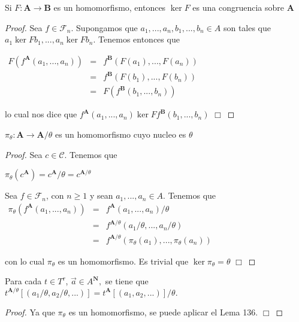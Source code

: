   \begin{lemma}
    Si \(F:\mathbf{A}\rightarrow \mathbf{B}\) es un homomorfismo, entonces \(\ker F\) es una congruencia sobre \(\mathbf{A}\)
  \end{lemma}
  \begin{proof}
    Sea \(f\in \mathcal{F}_{n}\). Supongamos que \(a_{1},...,a_{n},b_{1},...,b_{n} \in A\) son tales que \(a_{1}\ker Fb_{1},...,a_{n}\ker Fb_{n}\). Tenemos entonces que

    \(\displaystyle \begin{array}{ccl} F(f^{\mathbf{A}}(a_{1},...,a_{n})) & = & f^{\mathbf{B} }(F(a_{1}),...,F(a_{n})) \\ & = & f^{\mathbf{B}}(F(b_{1}),...,F(b_{n})) \\ & = & F(f^{\mathbf{B}}(b_{1},...,b_{n})) \end{array} \)

    lo cual nos dice que \(f^{\mathbf{A}}(a_{1},...,a_{n})\ker Ff^{\mathbf{B} }(b_{1},...,b_{n})\) \(\Box\)
  \end{proof}

  \begin{lemma}
    \(\pi _{\theta }:\mathbf{A}\rightarrow \mathbf{A}/\theta \) es un homomorfismo cuyo nucleo es \(\theta \)
  \end{lemma}
  \begin{proof}
    Sea \(c\in \mathcal{C}\). Tenemos que

    \(\displaystyle \pi _{\theta }(c^{\mathbf{A}})=c^{\mathbf{A}}/\theta =c^{\mathbf{A}/\theta } \)

    Sea \(f\in \mathcal{F}_{n}\), con \(n\geq 1\) y sean \(a_{1},...,a_{n}\in A\). Tenemos que
    \(\displaystyle \begin{array}{ccl} \pi _{\theta }(f^{\mathbf{A}}(a_{1},...,a_{n})) & = & f^{\mathbf{A} }(a_{1},...,a_{n})/\theta \\ & = & f^{\mathbf{A}/\theta }(a_{1}/\theta ,...,a_{n}/\theta ) \\ & = & f^{\mathbf{A}/\theta }(\pi _{\theta }(a_{1}),...,\pi _{\theta }(a_{n})) \end{array} \)

    con lo cual \(\pi _{\theta }\) es un homomorfismo. Es trivial que \(\ker \pi _{\theta }=\theta \) \(\Box\)
  \end{proof}

  \begin{corollary}
    Para cada \(t\in T^{\tau }\), \(\vec{a}\in A^{\mathbf{N} },\) se tiene que \(t^{\mathbf{A}/\theta }[(a_{1}/\theta ,a_{2}/\theta ,...)]=t^{\mathbf{A}}[(a_{1},a_{2},...)]/\theta .\)
  \end{corollary}
  \begin{proof}
    Ya que \(\pi _{\theta }\) es un homomorfismo, se puede aplicar el Lema 136. \(\Box\)
  \end{proof}

